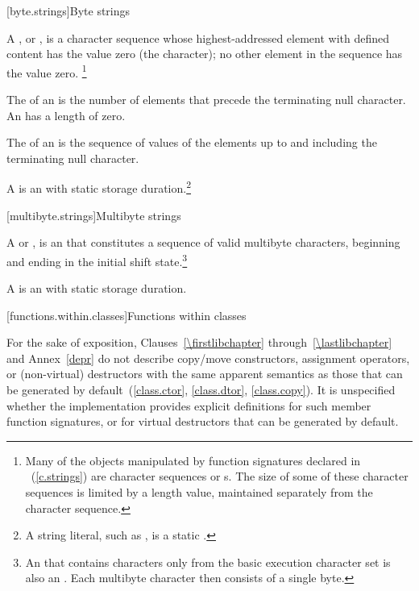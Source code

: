 [byte.strings]{Byte strings}

\pnum
A
%
%
,
or \ntbs,
is a character sequence whose highest-addressed element
with defined content has the value zero
(the
character); no other element in the sequence has the value zero.%
%
%
\footnote{Many of the objects manipulated by
function signatures declared in
~(\ref{c.strings}) are character sequences or \ntbs{}s.
%
%
The size of some of these character sequences is limited by
a length value, maintained separately from the character sequence.}

\pnum
The
 of an \ntbs
is the number of elements that
precede the terminating null character.
%
An
 \ntbs
has a length of zero.

\pnum
The
 of an \ntbs
is the sequence of values of the
elements up to and including the terminating null character.
%

\pnum
A
%
%
 \ntbs
is an \ntbs with
static storage duration.\footnote{A string literal, such as
,
is a static \ntbs.}

[multibyte.strings]{Multibyte strings}

\pnum
A
%
%
or \ntmbs,
%
is an \ntbs that constitutes a
sequence of valid multibyte characters, beginning and ending in the initial
shift state.\footnote{An \ntbs that contains characters only from the
basic execution character set is also an \ntmbs.
Each multibyte character then
consists of a single byte.}

\pnum
A
 \ntmbs
is an \ntmbs with static storage duration.
%
%

[functions.within.classes]{Functions within classes}

\pnum
For the sake of exposition, Clauses~\ref{\firstlibchapter} through~\ref{\lastlibchapter}
and Annex~\ref{depr} do not describe copy/move constructors, assignment
operators, or (non-virtual) destructors with the same apparent
semantics as those that can be generated by default~(\ref{class.ctor}, \ref{class.dtor}, \ref{class.copy}).
%
%
%
It is unspecified whether
the implementation provides explicit definitions for such member function
signatures, or for virtual destructors that can be generated by default.

